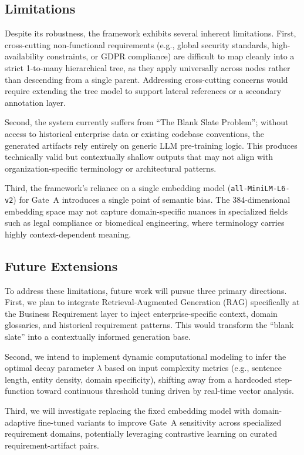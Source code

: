 \documentclass[journal]{IEEEtran}
\begin{document}
\subsection{Limitations}
Despite its robustness, the framework exhibits several inherent limitations. First, cross-cutting non-functional requirements (e.g., global security standards, high-availability constraints, or GDPR compliance) are difficult to map cleanly into a strict 1-to-many hierarchical tree, as they apply universally across nodes rather than descending from a single parent. Addressing cross-cutting concerns would require extending the tree model to support lateral references or a secondary annotation layer.

Second, the system currently suffers from ``The Blank Slate Problem''; without access to historical enterprise data or existing codebase conventions, the generated artifacts rely entirely on generic LLM pre-training logic. This produces technically valid but contextually shallow outputs that may not align with organization-specific terminology or architectural patterns.

Third, the framework's reliance on a single embedding model (\texttt{all-MiniLM-L6-v2}) for Gate~A introduces a single point of semantic bias. The 384-dimensional embedding space may not capture domain-specific nuances in specialized fields such as legal compliance or biomedical engineering, where terminology carries highly context-dependent meaning.

\subsection{Future Extensions}
To address these limitations, future work will pursue three primary directions. First, we plan to integrate Retrieval-Augmented Generation (RAG) specifically at the Business Requirement layer to inject enterprise-specific context, domain glossaries, and historical requirement patterns. This would transform the ``blank slate'' into a contextually informed generation base.

Second, we intend to implement dynamic computational modeling to infer the optimal decay parameter $\lambda$ based on input complexity metrics (e.g., sentence length, entity density, domain specificity), shifting away from a hardcoded step-function toward continuous threshold tuning driven by real-time vector analysis.

Third, we will investigate replacing the fixed embedding model with domain-adaptive fine-tuned variants to improve Gate~A sensitivity across specialized requirement domains, potentially leveraging contrastive learning on curated requirement-artifact pairs.




\end{document}

